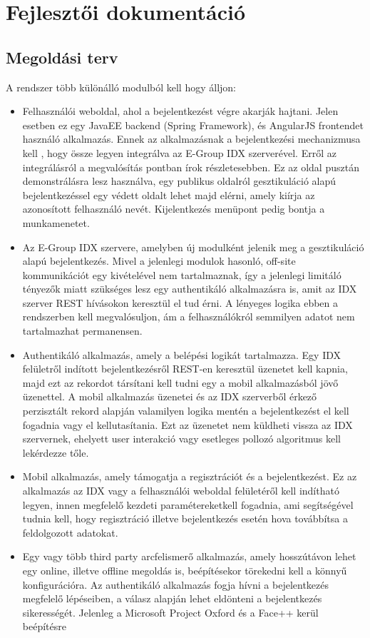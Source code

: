 \section{Fejlesztői dokumentáció}
\subsection{Megoldási terv}
A rendszer több különálló modulból kell hogy álljon:
\begin{itemize}
\item Felhasználói weboldal, ahol a bejelentkezést végre akarják hajtani. Jelen esetben ez egy JavaEE backend (Spring Framework), és AngularJS frontendet használó alkalmazás. Ennek az alkalmazásnak a bejelentkezési mechanizmusa kell , hogy össze legyen integrálva az E-Group IDX szerverével. Erről az integrálásról a megvalósítás pontban írok részletesebben. Ez az oldal pusztán demonstrálásra lesz használva, egy publikus oldalról gesztikuláció alapú bejelentkezéssel egy védett oldalt lehet majd elérni, amely kiírja az azonosított felhasználó nevét. Kijelentkezés menüpont pedig bontja a munkamenetet.
\item Az E-Group IDX szervere, amelyben új modulként jelenik meg a gesztikuláció alapú bejelentkezés. Mivel a jelenlegi modulok hasonló, off-site kommunikációt egy kivételével nem tartalmaznak, így a jelenlegi limitáló tényezők miatt szükséges lesz egy authentikáló alkalmazásra is, amit az IDX szerver REST hívásokon keresztül el tud érni. A lényeges logika ebben a rendszerben kell megvalósuljon, ám a felhasználókról semmilyen adatot nem tartalmazhat permanensen.
\item Authentikáló alkalmazás, amely a belépési logikát tartalmazza. Egy IDX felületről indított bejelentkezésről REST-en keresztül üzenetet kell kapnia, majd ezt az rekordot társítani kell tudni egy a mobil alkalmazásból jövő üzenettel. A mobil alkalmazás üzenetei és az IDX szerverből érkező perzisztált rekord alapján valamilyen logika mentén a bejelentkezést el kell fogadnia vagy el kellutasítania. Ezt az üzenetet nem küldheti vissza az IDX szervernek, ehelyett user interakció vagy esetleges pollozó algoritmus kell lekérdezze tőle.
\item Mobil alkalmazás, amely támogatja a regisztrációt és a bejelentkezést. Ez az alkalmazás az IDX vagy a felhasználói weboldal felületéről kell indítható legyen, innen megfelelő kezdeti paramétereketkell fogadnia, ami segítségével tudnia kell, hogy regisztráció illetve bejelentkezés esetén hova továbbítsa a feldolgozott adatokat.
\item Egy vagy több third party arcfelismerő alkalmazás, amely hosszútávon lehet egy online, illetve offline megoldás is, beépítésekor törekedni kell a könnyű konfigurációra. Az authentikáló alkalmazás fogja hívni a bejelentkezés megfelelő lépéseiben, a válasz alapján lehet eldönteni a bejelentkezés sikerességét. Jelenleg a Microsoft Project Oxford és a Face++ kerül beépítésre
\end{itemize}



